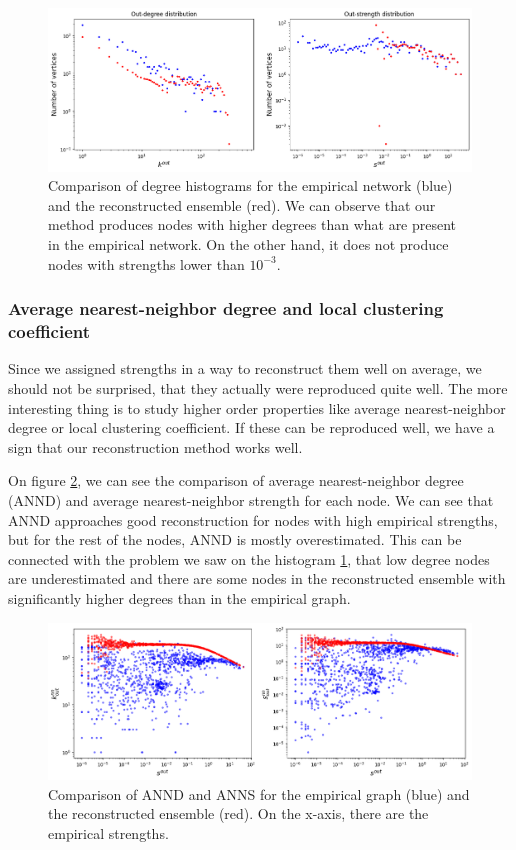 \begin{figure}[!ht]
    \centering
    \includegraphics[scale=0.5]{../img/vanilla_SIM/deg_strengths_hist_rec.png}
    \caption{Comparison of degree histograms for the empirical network (blue) and the reconstructed ensemble (red). We can observe that our method produces nodes with higher degrees than what are present in the empirical network. On the other hand, it does not produce nodes with strengths lower than $10^{-3}$.}
    \label{fig:deg_strengths_hist_rec}
\end{figure}

\subsubsection{Average nearest-neighbor degree and local clustering coefficient}
Since we assigned strengths in a way to reconstruct them well on average, we should not be surprised, that they actually were reproduced quite well. The more interesting thing is to study higher order properties like average nearest-neighbor degree or local clustering coefficient. If these can be reproduced well, we have a sign that our reconstruction method works well. 

On figure \ref*{fig:ANND_ANNS}, we can see the comparison of average nearest-neighbor degree (ANND) and average nearest-neighbor strength for each node. We can see that ANND approaches good reconstruction for nodes with high empirical strengths, but for the rest of the nodes, ANND is mostly overestimated. This can be connected with the problem we saw on the histogram \ref*{fig:deg_strengths_hist_rec}, that low degree nodes are underestimated and there are some nodes in the reconstructed ensemble with significantly higher degrees than in the empirical graph.

\begin{figure}[!ht]
    \centering
    \includegraphics[scale=0.5]{../img/vanilla_SIM/ANND_ANNS.png}
    \caption{Comparison of ANND and ANNS for the empirical graph (blue) and the reconstructed ensemble (red). On the x-axis, there are the empirical strengths.}
    \label{fig:ANND_ANNS}
\end{figure}

